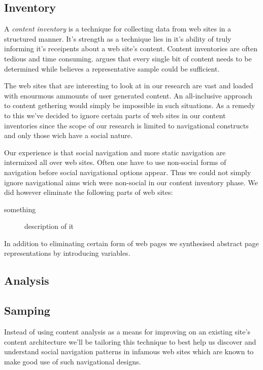 \subsection{Inventory}

A \emph{content inventory} is a technique for collecting data from web sites
in a structured manner. It's strength as a technique lies in it's ability of
truly informing it's receipents about a web site's content. Content
inventories are often tedious and time consuming. \citet[p.~267]{wodtke02}
argues that every single bit of content needs to be determined while
\citet{morville06} believes a representative sample could be sufficient.

The web sites that are interesting to look at in our research are vast and
loaded with enourmous ammounts of user generated content. An all-inclusive
approach to content gethering would simply be impossible in such situations.
As a remedy to this we've decided to ignore certain parts of web sites in our
content inventories since the scope of our research is limited to navigational
constructs and only those wich have a social nature.

Our experience is that social navigation and more static navigation are
intermixed all over web sites. Often one have to use non-social forms of
navigation before social navigational options appear. Thus we could not simply
ignore navigational aims wich were non-social in our content inventory phase.
We did however eliminate the following parts of web sites:

\begin{description}
  \item[something] description of it
\end{description}

In addition to eliminating certain form of web pages we synthesised abstract
page representations by introducing variables. %


\subsection{Analysis}

\subsection{Samping}


Instead of using content analysis as a means for improving on an existing
site's content architecture we'll be tailoring this technique to best help us
discover and understand social navigation patterns in infamous web sites which
are known to make good use of such navigational designs.

